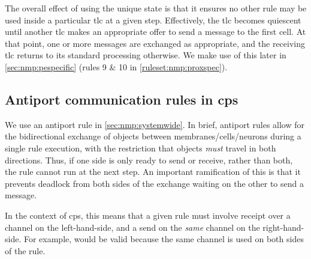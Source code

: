 The overall effect of using the unique state is that it ensures no other rule may be used inside a particular \gls{tlc} at a given step.  Effectively, the \gls{tlc} becomes quiescent until another \gls{tlc} makes an appropriate offer to send a message to the first cell.  At that point, one or more messages are exchanged as appropriate, and the receiving \gls{tlc} returns to its standard processing otherwise.  We make use of this later in \autoref{sec:nmp:pespecific} (rules 9 \& 10 in \autoref{ruleset:nmp:proxspec}).

\subsection{\label{sec:nmp:antiport}Antiport communication rules in \texorpdfstring{\gls{cps}}{cP systems}}

We use an antiport rule \cite{Orellana-Martin2019,Paun2002} in \autoref{sec:nmp:systemwide}.  In brief, antiport rules allow for the bidirectional exchange of objects between membranes/cells/neurons during a single rule execution, with the restriction that objects \emph{must} travel in both directions.  Thus, if one side is only ready to send or receive, rather than both, the rule cannot run at the next step.  An important ramification of this is that it prevents deadlock from both sides of the exchange waiting on the other to send a message.

In the context of \gls{cps}, this means that a given rule must involve receipt over a channel on the left-hand-side, and a send on the \emph{same} channel on the right-hand-side.  For example,  would be valid because the same channel is used on both sides of the rule.
